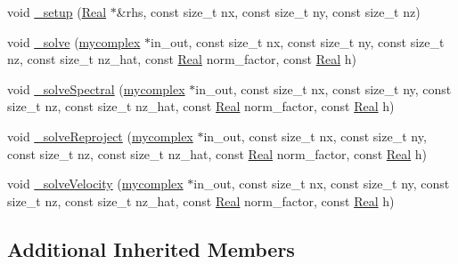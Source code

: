 \begin{DoxyCompactItemize}
\item 
void \hyperlink{class_poisson_solver_vector_f_f_t_w_adcd7c736fd7735c09a2f36732f1afed4}{\+\_\+setup} (\hyperlink{_h_d_f5_dumper_8h_a445a5f0e2a34c9d97d69a3c2d1957907}{Real} $\ast$\&rhs, const size\+\_\+t nx, const size\+\_\+t ny, const size\+\_\+t nz)
\item 
void \hyperlink{class_poisson_solver_vector_f_f_t_w_a2e8fb75577bda2e3e660ac3af73c2ef2}{\+\_\+solve} (\hyperlink{_poisson_solver_scalar_f_f_t_w_8h_af35d52b40fd37a740c7a93765c33e7e5}{mycomplex} $\ast$in\+\_\+out, const size\+\_\+t nx, const size\+\_\+t ny, const size\+\_\+t nz, const size\+\_\+t nz\+\_\+hat, const \hyperlink{_h_d_f5_dumper_8h_a445a5f0e2a34c9d97d69a3c2d1957907}{Real} norm\+\_\+factor, const \hyperlink{_h_d_f5_dumper_8h_a445a5f0e2a34c9d97d69a3c2d1957907}{Real} h)
\item 
void \hyperlink{class_poisson_solver_vector_f_f_t_w_aba70e32d3671e7ce88c34d37e7e43232}{\+\_\+solve\+Spectral} (\hyperlink{_poisson_solver_scalar_f_f_t_w_8h_af35d52b40fd37a740c7a93765c33e7e5}{mycomplex} $\ast$in\+\_\+out, const size\+\_\+t nx, const size\+\_\+t ny, const size\+\_\+t nz, const size\+\_\+t nz\+\_\+hat, const \hyperlink{_h_d_f5_dumper_8h_a445a5f0e2a34c9d97d69a3c2d1957907}{Real} norm\+\_\+factor, const \hyperlink{_h_d_f5_dumper_8h_a445a5f0e2a34c9d97d69a3c2d1957907}{Real} h)
\item 
void \hyperlink{class_poisson_solver_vector_f_f_t_w_a0b8eb758fcecaaa5f4d8332cdb1dc735}{\+\_\+solve\+Reproject} (\hyperlink{_poisson_solver_scalar_f_f_t_w_8h_af35d52b40fd37a740c7a93765c33e7e5}{mycomplex} $\ast$in\+\_\+out, const size\+\_\+t nx, const size\+\_\+t ny, const size\+\_\+t nz, const size\+\_\+t nz\+\_\+hat, const \hyperlink{_h_d_f5_dumper_8h_a445a5f0e2a34c9d97d69a3c2d1957907}{Real} norm\+\_\+factor, const \hyperlink{_h_d_f5_dumper_8h_a445a5f0e2a34c9d97d69a3c2d1957907}{Real} h)
\item 
void \hyperlink{class_poisson_solver_vector_f_f_t_w_a04566e264ed8447f4f8d4d6753443a27}{\+\_\+solve\+Velocity} (\hyperlink{_poisson_solver_scalar_f_f_t_w_8h_af35d52b40fd37a740c7a93765c33e7e5}{mycomplex} $\ast$in\+\_\+out, const size\+\_\+t nx, const size\+\_\+t ny, const size\+\_\+t nz, const size\+\_\+t nz\+\_\+hat, const \hyperlink{_h_d_f5_dumper_8h_a445a5f0e2a34c9d97d69a3c2d1957907}{Real} norm\+\_\+factor, const \hyperlink{_h_d_f5_dumper_8h_a445a5f0e2a34c9d97d69a3c2d1957907}{Real} h)
\end{DoxyCompactItemize}
\subsection*{Additional Inherited Members}


